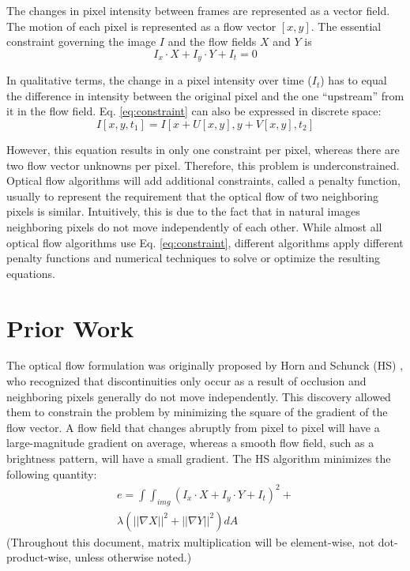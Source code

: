 \documentclass[10pt,twocolumn,letterpaper]{article}
\begin{document}
The changes in pixel intensity between frames are represented as a vector field. The motion of each pixel is represented as a flow vector $[x, y]$. The essential constraint governing the image $I$ and the flow fields $X$ and $Y$ is
\begin{equation} \label{eq:constraint}
I_x \cdot X+ I_y \cdot Y + I_t = 0
\end{equation}


In qualitative terms, the change in a pixel intensity over time ($I_t$) has to equal the difference in intensity between the original pixel and the one “upstream” from it in the flow field. Eq. \ref{eq:constraint} can also be expressed in discrete space:
\begin{equation} \label{eq:discrete}
I[x, y, t_1] = I[x + U[x, y], y + V[x, y], t_2]
\end{equation}

However, this equation results in only one constraint per pixel, whereas there are two flow vector unknowns per pixel. Therefore, this problem is underconstrained. \cite{wu} Optical flow algorithms will add additional constraints, called a penalty function, usually to represent the requirement that the optical flow of two neighboring pixels is similar. Intuitively, this is due to the fact that in natural images neighboring pixels do not move independently of each other. While almost all optical flow algorithms use Eq. \ref{eq:constraint}, different algorithms apply different penalty functions and numerical techniques to solve or optimize the resulting equations.

\section{Prior Work}
The optical flow formulation was originally proposed by Horn and Schunck (HS) \cite{horn}, who recognized that discontinuities only occur as a result of occlusion and neighboring pixels generally do not move independently. This discovery allowed them to constrain the problem by minimizing the square of the gradient of the flow vector. A flow field that changes abruptly from pixel to pixel will have a large-magnitude gradient on average, whereas a smooth flow field, such as a brightness pattern, will have a small gradient. The HS algorithm minimizes the following quantity:
\begin{multline} \label{eq:hsObj}
e = \int \int_{img} (I_x \cdot X + I_y \cdot Y + I_t)^2 + \\
\lambda ( ||\nabla X||^2 + ||\nabla Y||^2 ) dA
\end{multline}
(Throughout this document, matrix multiplication will be element-wise, not dot-product-wise, unless otherwise noted.)
\end{document}
